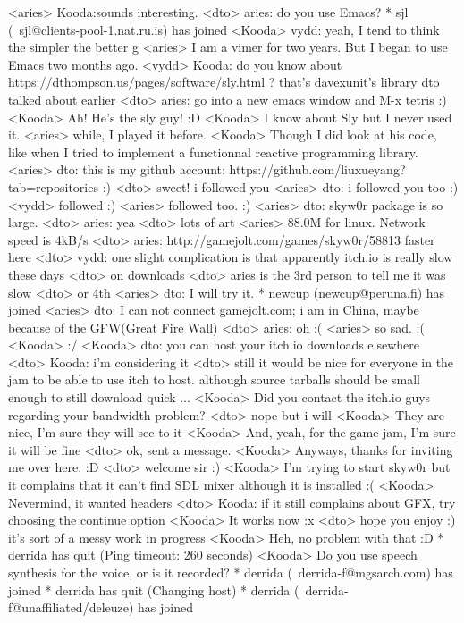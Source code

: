 \documentclass[a4paper,11pt]{article}
\begin{document}
<aries> Kooda:sounds interesting.
<dto> aries: do you use Emacs?
* sjl (~sjl@clients-pool-1.nat.ru.is) has joined
<Kooda> vydd: yeah, I tend to think the simpler the better ^^'
<aries> I am a vimer for two years. But I began to use Emacs two months ago. 
<vydd> Kooda: do you know about https://dthompson.us/pages/software/sly.html ? that's davexunit's library dto talked about earlier
<dto> aries: go into a new emacs window and M-x tetris :)
<Kooda> Ah! He’s the sly guy! :D
<Kooda> I know about Sly but I never used it.
<aries> while, I played it before.
<Kooda> Though I did look at his code, like when I tried to implement a functionnal reactive programming library.
<aries> dto: this is my github account: https://github.com/liuxueyang?tab=repositories :)
<dto> sweet! i followed you
<aries> dto: i followed you too :)
<vydd> followed :)
<aries> followed too. :)
<aries> dto: skyw0r package is so large.
<dto> aries: yea
<dto> lots of art
<aries> 88.0M for linux. Network speed is 4kB/s
<dto> aries: http://gamejolt.com/games/skyw0r/58813   faster here
<dto> vydd: one slight complication is that apparently itch.io is really slow these days
<dto> on downloads
<dto> aries is the 3rd person to tell me it was slow
<dto> or 4th
<aries> dto: I will try it.
* newcup (newcup@peruna.fi) has joined
<aries> dto: I can not connect gamejolt.com; i am in China, maybe because of the GFW(Great Fire Wall)
<dto> aries: oh :(
<aries> so sad. :(
<Kooda> :/
<Kooda> dto: you can host your itch.io downloads elsewhere
<dto> Kooda: i'm considering it
<dto> still it would be nice for everyone in the jam to be able to use itch to host. although source tarballs should be small enough to still download quick ...
<Kooda> Did you contact the itch.io guys regarding your bandwidth problem?
<dto> nope but i will
<Kooda> They are nice, I’m sure they will see to it
<Kooda> And, yeah, for the game jam, I’m sure it will be fine
<dto> ok, sent a message.
<Kooda> Anyways, thanks for inviting me over here. :D
<dto> welcome sir :)
<Kooda> I’m trying to start skyw0r but it complains that it can’t find SDL mixer although it is installed :(
<Kooda> Nevermind, it wanted headers
<dto> Kooda: if it still complains about GFX, try choosing the continue option
<Kooda> It works now :x
<dto> hope you enjoy :) it's sort of a messy work in progress
<Kooda> Heh, no problem with that :D
* derrida has quit (Ping timeout: 260 seconds)
<Kooda> Do you use speech synthesis for the voice, or is it recorded?
* derrida (~derrida-f@mgsarch.com) has joined
* derrida has quit (Changing host)
* derrida (~derrida-f@unaffiliated/deleuze) has joined
\end{document}

